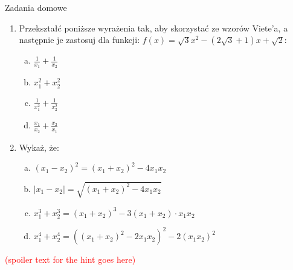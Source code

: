 \documentclass[12pt,a4paper]{article}
\begin{document}
	\begin{center}
		\LARGE Zadania domowe
	\end{center}
	\vspace{1.5cm}
	
	\begin{enumerate}[1.]
		\item Przekształć poniższe wyrażenia tak, aby skorzystać ze wzorów Viete'a, a następnie je zastosuj dla funkcji: $f(x)=\sqrt{3}x^2-(2\sqrt{3}+1)x+\sqrt{2}$:
		
		\begin{enumerate}[a)]
			\item $\frac{1}{x_1}+\frac{1}{x_2}$
			\item $x_1^2+x_2^2$
			\item $\frac{1}{x_1^2}+\frac{1}{x_2^2}$
			\item $\frac{x_1}{x_2}+\frac{x_2}{x_1}$
		\end{enumerate}
	
		\item Wykaż, że:
		\begin{enumerate}[a)]
			\item $(x_1-x_2)^2=(x_1+x_2)^2-4x_1x_2$
			\item $|x_1-x_2|=\sqrt{(x_1+x_2)^2-4x_1x_2}$
			\item $x_1^3+x_2^3=(x_1+x_2)^3-3(x_1+x_2)\cdot x_1x_2$
			\item $x_1^4+x_2^4=((x_1+x_2)^2-2x_1x_2)^2-2(x_1x_2)^2$
		\end{enumerate}
	\end{enumerate}
	\textcolor{red}{(spoiler text for the hint goes here)}
	
	
	
\end{document}
